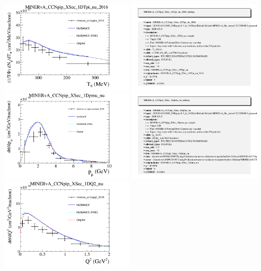 \documentclass{article}
\begin{document}
\centering
\includegraphics[width=0.49\textwidth]{figures/minerva_cc1pipke_2016_comp.png}
\includegraphics[width=0.49\textwidth]{figures/minerva_cc1pipke_2016_info.png}
\centering
\includegraphics[width=0.49\textwidth]{figures/minerva_cc1pipmuonmom_2016_comp.png}
\includegraphics[width=0.49\textwidth]{figures/minerva_cc1pipmuonmom_2016_info.png}
\centering
\includegraphics[width=0.49\textwidth]{figures/minerva_cc1pipq2_2016_comp.png}
\end{document}
